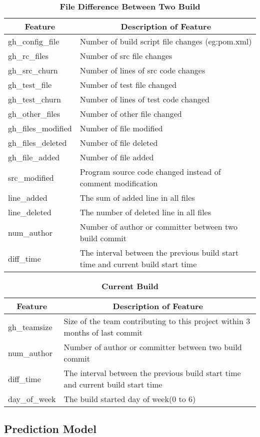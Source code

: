 \begin{table}[!htbp] 
\setlength{\abovecaptionskip}{0.2cm}
\caption{\large{\textbf{File Difference Between Two Build}}}

\begin{tabular}{|p{7em}|p{16em}|}
\hline
 \multicolumn{1}{|c|}{\textbf{Feature}} &\multicolumn{1}{|c|}{\textbf{Description of Feature}}\\
\hline
 gh\_config\_file & Number of build script file changes (eg:pom.xml) \\ \hline
 gh\_rc\_files & Number of src file changes \\ \hline
 gh\_src\_churn & Number of lines of src code changes\\ \hline
 gh\_test\_file & Number of test file changed\\ \hline
 gh\_test\_churn & Number of lines of test code changed\\ \hline
 gh\_other\_files & Number of other file changed\\ \hline
 gh\_files\_modified & Number of file modified\\ \hline
 gh\_files\_deleted & Number of file deleted\\ \hline
 gh\_file\_added & Number of file added\\ \hline
 src\_modified & Program source code changed instead of comment modification\\ \hline
 line\_added & The sum of added line in all files\\ \hline
 line\_deleted & The number of deleted line in all files\\ \hline
 num\_author& Number of author or committer between two build commit\\ \hline
 diff\_time &The interval between the previous build start time and current build start time\\ \hline
 
\end{tabular}
\end{table}
\begin{table}[!htbp] 
\setlength{\abovecaptionskip}{0.2cm}
\caption{\large{\textbf{Current Build}}}

\begin{tabular}{|p{7em}|p{16em}|}
\hline
 \multicolumn{1}{|c|}{\textbf{Feature}} &\multicolumn{1}{|c|}{\textbf{Description of Feature}}\\
\hline
 gh\_teamsize& Size of the team contributing to this project within 3 months of last commit\\ \hline
 num\_author& Number of author or committer between two build commit\\ \hline
 diff\_time &The interval between the previous build start time and current build start time\\ \hline
 day\_of\_week & The build started day of week(0 to 6)\\ \hline

 
\end{tabular}
\end{table}


\subsection{Prediction Model}


